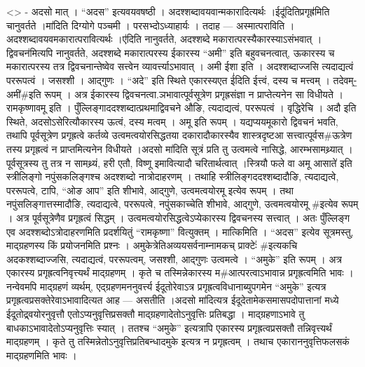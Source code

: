 \textless{}\textgreater{} - अदसो मात् । ``अदस'' इत्यवयवषष्ठी ।
अदश्शब्दावयवान्मकारादित्यर्थः ।ईदू॑दितिप्रगृह्र॑मिति चानुवर्तते ।मा॑दिति
दिग्योगे पञ्चमी । परसभ्दोऽध्याहार्यः । तदाह --- अस्मात्पराविति ।
अदश्शब्दावयवमकारात्परावित्यर्थः ।ए॑दिति नानुवर्तते, अदश्शब्दे
मकारात्परस्यैकारस्याऽसंभवात् ।द्विवचन॑मित्यपि नानुवर्तते, अदश्शब्दे
मकारात्परस्य ईकारस्य ``अमी'' इति बहुवचनत्वात्, ऊकारस्य च मकारात्परस्य
तत्र द्विवचनान्तेष्वेव सत्त्वेन व्यावर्त्त्याऽभावात् । अमी ईशा इति ।
अदश्शब्दाज्जसि त्यदाद्यत्वं पररूपत्वं । जसश्शी । आद्गुणः । ``अदे'' इति
स्थिते एकारस्यएत ई॑दिति ईत्त्वं, दस्य च मत्त्वम् । तदेवम्-॒अमी॑\#इति
रूपम् । अत्र ईकारस्य द्विवचनत्वा.ञभावात्पूर्वसूत्रेण प्रगृह्रसंज्ञा न
प्राप्तेत्यनेन सा विधीयते । रामकृष्णावमू इति ।
पुँल्लिङ्गाददश्शब्दात्प्रथमाद्विवचने औङि, त्यदाद्यत्वं, पररूपत्वं ।
वृद्धिरेचि । अदौ इति स्थिते, अदसोऽसेरित्यौकारस्य ऊत्वं, दस्य मत्वम् ।
अमू इति रूपम् । यद्यप्ययमूकारो द्विवचनं भवति, तथापि पूर्वसूत्रेण
प्रगृह्रत्वे कर्तव्ये उत्वमत्वयोरसिद्धतया दकारादौकारस्यैव शास्त्रदृष्टआ
सत्त्वात्पूर्वस\#ऊत्रेण तस्य प्रगृह्रत्वं न प्राप्तमित्यनेन विधीयते
।अदसो मा॑दिति सूत्रं प्रति तु उत्वमत्वे नासिद्धे, आरम्भसामथ्र्यात् ।
पूर्वसूत्रस्य तु तत्र न सामथ्र्यं, हरी एतौ, विष्णू इमावित्यादौ
चरितार्थत्वात् ।स्त्रियौ फले वा अमू आसाते॑ इति स्त्रीलिङ्गो
नपुंसकलिङ्गश्च अदश्शब्दो नात्रोदाहरणम् । तथाहि स्त्रीलिङ्गददश्शब्दादौङि,
त्यदाद्यत्वे, पररूपत्वे, टापि, ``ओङ आप'' इति शीभावे, आद्गुणे,
उत्वमत्वयोरमू इत्येव रूपम् । तथा नपुंसलिङ्गात्तस्मादौङि, त्यदाद्यत्वे,
पररूपत्वे, नपुंसकाच्चेति शीभावे, आद्गुणे, उत्वमत्वयोरमू \#इत्येव रूपम् ।
अत्र पूर्वसूत्रेणैव प्रगृह्रत्वं सिद्धम् ।
उत्वमत्वयोरसिद्धत्वेऽप्येकारस्य द्विवचनस्य सत्त्वात् । अतः पुँल्लिङ्ग एव
अदश्शब्दोऽत्रोदाहरणमिति प्रदर्शयितुं ``रामकृष्णा'' वित्युक्तम् ।
मात्किमिति । ``अदस'' इत्येव सूत्रमस्तु, माद्ग्रहणस्य किं प्रयोजनमिति
प्रश्नः । अमुकेत्रेतिअव्ययसर्वनाम्नामकच् प्राक्टेः॑ \#इत्यकचि
अदकश्शब्दाज्जसि, त्यदाद्यत्वं, पररूपत्वम्, जसश्शी, आद्गुणः उत्वमत्वे ।
``अमुके'' इति रूपम् । अत्र एकारस्य प्रगृह्रत्वनिवृत्त्यर्थं माद्ग्रहणम्
। कृते च तस्मिन्नेकारस्य म\#आत्परत्वाऽभावान्न प्रगृह्रत्वमिति भावः ।
नन्वेवमपि माद्ग्रहणं व्यर्थम्, एद्ग्रहणमननुवर्त्त्य ईदूतोरेवाऽत्र
प्रगृह्रत्वविधानाब्युपगमेन ``अमुके'' इत्यत्र
प्रगृह्रत्वप्रसक्तेरेवाऽभावादित्यत आह --- असतीति ।अदसो मा॑दित्यत्र
ईदूदेतामेकसमासपदोपात्तानां मध्ये ईदूतोद्र्वयोरनुवृत्तौ
एतोऽप्यनुवृत्तिप्रसक्तौ माद्ग्रहणादेतोऽनुवृत्तिः प्रतिबद्धा ।
माद्ग्रहणाऽभावे तु बाधकाऽभावादेतोऽप्यनुवृत्तिः स्यात् । ततश्च ``अमुके''
इत्यत्रापि एकारस्य प्रगृह्रत्वप्रसक्तौ तन्निवृत्त्यर्थं माद्ग्रहणम् ।
कृते तु तस्मिन्नेतोऽनुवृत्तिप्रतिबन्धादमुके इत्यत्र न प्रगृह्रत्वम् ।
तथाच एकाराननुवृत्तिफलसकं माद्ग्रहणमिति भावः ।
